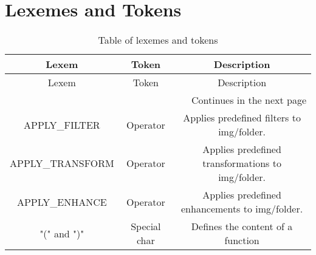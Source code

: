 \section{Lexemes and Tokens}
\begin{longtable}[c]{|c|c|c|}
\caption{Table of lexemes and tokens}\\
\hline
    Lexem & Token & Description \\
\hline
\endfirsthead
\hline
    Lexem & Token & Description \\
\hline
\endhead %
\hline \multicolumn{3}{r}{{Continues in the next page}} \\ \hline
\endfoot %
\hline
\endlastfoot %
\hline

\hline
    APPLY\_FILTER & Operator & Applies predefined filters to img/folder. \\
    APPLY\_TRANSFORM & Operator & Applies predefined transformations  to img/folder. \\
    APPLY\_ENHANCE & Operator & Applies predefined enhancements  to img/folder. \\
    "(" and ")" & Special char & Defines the content of a function \\
\hline

\end{longtable}